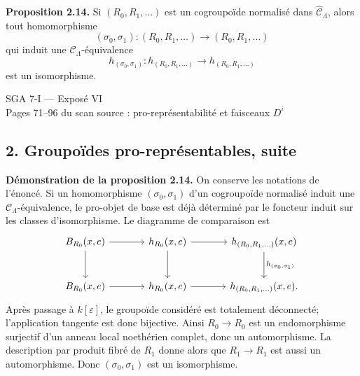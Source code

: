 \documentclass[11pt]{article}
\providecommand{\id}{\operatorname{id}}
\begin{document}
\textbf{Proposition 2.14.} Si \((R_0,R_1,\ldots)\) est un cogroupo\"ide normalis\'e dans
\(\widehat{\mathcal C}_\Lambda\), alors tout homomorphisme
\[
 (\sigma_0,\sigma_1):(R_0,R_1,\ldots)\longrightarrow(R_0,R_1,\ldots)
\]
qui induit une \(\mathcal C_\Lambda\)-\'equivalence
\[
 h_{(\sigma_0,\sigma_1)}:
 h_{(R_0,R_1,\ldots)}\longrightarrow h_{(R_0,R_1,\ldots)}
\]
est un isomorphisme.



\providecommand{\Der}{\operatorname{Der}}
\providecommand{\Coker}{\operatorname{Coker}}
\providecommand{\Cov}{\operatorname{Cov}}
\providecommand{\Exalcomm}{\operatorname{Exalcomm}}
\providecommand{\id}{\operatorname{id}}
\providecommand{\cC}{\mathcal C}
\providecommand{\cH}{\mathcal H}
\providecommand{\cP}{\mathcal P}
\providecommand{\cE}{\mathcal E}
\providecommand{\what}{\widehat}
\providecommand{\wt}{\widetilde}
\providecommand{\mhat}{\widehat{\mathfrak m}}
\providecommand{\Rhat}{\widehat R}
\providecommand{\Ahat}{\widehat A}
\providecommand{\Bhat}{\widehat B}
\providecommand{\Ehat}{\widehat E}


\begin{center}
{\Large SGA 7-I — Exposé VI}\\[0.3em]
{\large Pages 71--96 du scan source : pro-représentabilité et faisceaux \(D^i\)}
\end{center}

\subsection*{2. Groupoïdes pro-représentables, suite}

\textbf{Démonstration de la proposition 2.14.}  On conserve les notations de l'énoncé.  Si un homomorphisme \((\sigma_0,\sigma_1)\) d'un cogroupoïde normalisé induit une \(\cC_\Lambda\)-équivalence, le pro-objet de base est déjà déterminé par le foncteur induit sur les classes d'isomorphisme.  Le diagramme de comparaison est
\[
\begin{tikzcd}[column sep=large,row sep=large]
 B_{R_0}(x,e) \arrow[r] \arrow[d] & h_{R_0}(x,e) \arrow[r] \arrow[d] & h_{(R_0,R_1,\ldots)}(x,e) \arrow[d,"h_{(\sigma_0,\sigma_1)}"] \\
 B_{R_0}(x,e) \arrow[r] & h_{R_0}(x,e) \arrow[r] & h_{(R_0,R_1,\ldots)}(x,e).
\end{tikzcd}
\]
Après passage à \(k[\varepsilon]\), le groupoïde considéré est totalement déconnecté; l'application tangente est donc bijective.  Ainsi \(R_0\to R_0\) est un endomorphisme surjectif d'un anneau local noethérien complet, donc un automorphisme.  La description par produit fibré de \(R_1\) donne alors que \(R_1\to R_1\) est aussi un automorphisme.  Donc \((\sigma_0,\sigma_1)\) est un isomorphisme.
\end{document}
